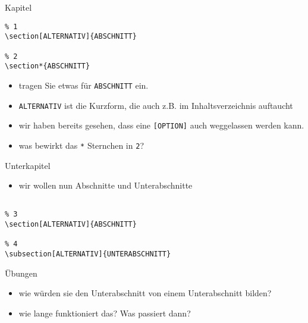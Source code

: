 \begin{frame}[fragile]{Kapitel}

\begin{verbatim}
% 1
\section[ALTERNATIV]{ABSCHNITT}

% 2
\section*{ABSCHNITT}
\end{verbatim}

\begin{itemize}
\itemsep1pt\parskip0pt
\item
  tragen Sie etwas für \texttt{ABSCHNITT} ein.
\item
  \texttt{ALTERNATIV} ist die Kurzform, die auch z.B. im
  Inhaltsverzeichnis auftaucht
\item
  wir haben bereits gesehen, dass eine \texttt{{[}OPTION{]}} auch
  weggelassen werden kann.
\item
  was bewirkt das \texttt{*} Sternchen in \texttt{2}?
\end{itemize}

\end{frame}

\begin{frame}[fragile]{Unterkapitel}

\begin{itemize}
\itemsep1pt\parskip0pt
\item
  wir wollen nun Abschnitte und Unterabschnitte
\end{itemize}

\begin{verbatim}

% 3
\section[ALTERNATIV]{ABSCHNITT}

% 4
\subsection[ALTERNATIV]{UNTERABSCHNITT}
\end{verbatim}

\end{frame}

\begin{frame}{Übungen}

\begin{itemize}
\itemsep1pt\parskip0pt
\item
  wie würden sie den Unterabschnitt von einem Unterabschnitt bilden?
\item
  wie lange funktioniert das? Was passiert dann?
\end{itemize}

\end{frame}

